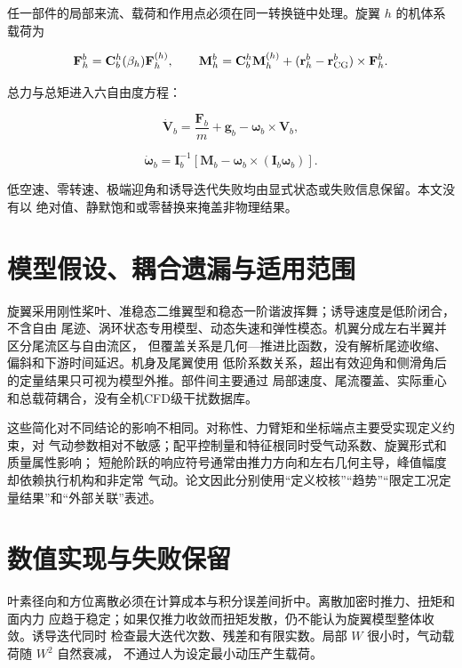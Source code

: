 \documentclass[UTF8,12pt,oneside,openany,fontset=windows]{ctexbook}
\begin{document}
任一部件的局部来流、载荷和作用点必须在同一转换链中处理。旋翼 \(h\) 的机体系载荷为

\begin{equation}
\mathbf F_h^b=\mathbf C_b^h(\beta_h)\mathbf F_h^{(h)},\qquad
\mathbf M_h^b=\mathbf C_b^h\mathbf M_h^{(h)}
+(\mathbf r_h^b-\mathbf r_{\rm CG}^b)\times\mathbf F_h^b.
\end{equation}

总力与总矩进入六自由度方程：

\begin{equation}
\dot{\mathbf V}_b=\frac{\mathbf F_b}{m}+\mathbf g_b
-\boldsymbol\omega_b\times\mathbf V_b,
\end{equation}

\begin{equation}
\dot{\boldsymbol\omega}_b=\mathbf I_b^{-1}
\left[\mathbf M_b-\boldsymbol\omega_b\times(\mathbf I_b\boldsymbol\omega_b)\right].
\end{equation}

低空速、零转速、极端迎角和诱导迭代失败均由显式状态或失败信息保留。本文没有以 绝对值、静默饱和或零替换来掩盖非物理结果。

\section{模型假设、耦合遗漏与适用范围}

旋翼采用刚性桨叶、准稳态二维翼型和稳态一阶谐波挥舞；诱导速度是低阶闭合，不含自由 尾迹、涡环状态专用模型、动态失速和弹性模态。机翼分成左右半翼并区分尾流区与自由流区， 但覆盖关系是几何—推进比函数，没有解析尾迹收缩、偏斜和下游时间延迟。机身及尾翼使用 低阶系数关系，超出有效迎角和侧滑角后的定量结果只可视为模型外推。部件间主要通过 局部速度、尾流覆盖、实际重心和总载荷耦合，没有全机CFD级干扰数据库。

这些简化对不同结论的影响不相同。对称性、力臂矩和坐标端点主要受实现定义约束，对 气动参数相对不敏感；配平控制量和特征根同时受气动系数、旋翼形式和质量属性影响； 短舱阶跃的响应符号通常由推力方向和左右几何主导，峰值幅度却依赖执行机构和非定常 气动。论文因此分别使用“定义校核”“趋势”“限定工况定量结果”和“外部关联”表述。

\section{数值实现与失败保留}

叶素径向和方位离散必须在计算成本与积分误差间折中。离散加密时推力、扭矩和面内力 应趋于稳定；如果仅推力收敛而扭矩发散，仍不能认为旋翼模型整体收敛。诱导迭代同时 检查最大迭代次数、残差和有限实数。局部 \(W\) 很小时，气动载荷随 \(W^2\) 自然衰减， 不通过人为设定最小动压产生载荷。
\end{document}
